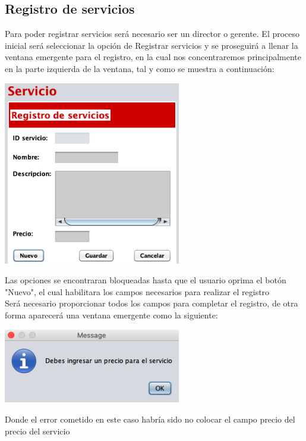 \documentclass[12pt]{article}
\begin{document}
\begin{flushleft}
\section{Registro de servicios}
\textsf{Para poder registrar servicios será necesario ser un director o gerente. El proceso inicial será seleccionar la opción de Registrar servicios y se proseguirá a llenar la ventana emergente para el registro, en la cual nos concentraremos principalmente en la parte izquierda de la ventana, tal y como se muestra a continuación: }
\vspace{0.5cm}
\begin{center}
\includegraphics[width=7.75cm]{7.png}
\end{center}
\vspace{0.5cm}
\textsf{Las opciones se encontraran bloqueadas hasta que el usuario oprima el botón "Nuevo", el cual habilitara los campos necesarios para realizar el registro\vspace{0.5cm} \\Será necesario proporcionar todos los campos para completar el registro, de otra forma aparecerá una ventana emergente como la siguiente: }
\vspace{0.5cm}
\begin{center}
\includegraphics[width=7.75cm]{8.png}
\end{center}
\textsf{Donde el error cometido en este caso habría sido no colocar el campo precio del precio del servicio\\}

\end{flushleft}
\end{document}
